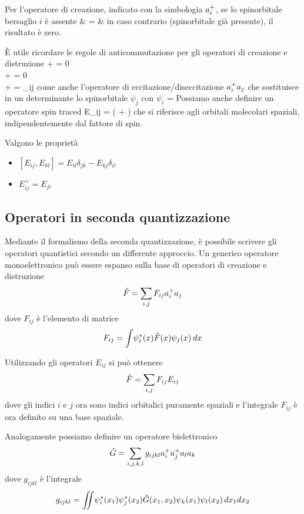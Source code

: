 Per l'operatore di creazione, indicato con la simbologia $a_{i}^{+}$, se
lo spinorbitale bersaglio $i$ \`e assente
\beqas
{} \detsl{\psi_1 \psi_2 \ldots } & = &
\eeqas
in caso contrario (spinorbitale gi\`a presente), il risultato \`e zero.

\`E utile ricordare le regole di anticommutazione per gli operatori di
creazione e distruzione
\beqas
{}+ = 0 \\
+ = 0 \\
+ = \delta_{ij}
\eeqas
come anche l'operatore di eccitazione/diseccitazione $a_{i}^{+}a_{j}$ che
sostituisce in un determinante lo spinorbitale $\psi_j$ con $\psi_i$
\beq
{}  =
\eeq
Possiamo anche definire un operatore spin traced
\beq
E_{ij} = \left(  +
 \right)
\eeq
che si riferisce agli orbitali molecolari spaziali,
indipendentemente dal fattore di spin.

Valgono le propriet\`a
\begin{itemize}
\item $ \left[ E_{ij}, E_{kl} \right] = E_{il}\delta_{jk} -
E_{kj}\delta_{il} $
\item $ E^{+}_{ij} = E_{ji} $
\end{itemize}

\subsection{Operatori in seconda quantizzazione}

Mediante il formalismo della seconda quantizzazione, \`e possibile
scrivere gli operatori quantistici secondo un differente approccio.
Un generico operatore monoelettronico pu\`o essere espanso sulla base di
operatori di creazione e distruzione
$$
\hat{F} = \sum_{i,j} F_{ij} a_{i}^{+}a_{j}
$$
dove $F_{ij}$ \`e l'elemento di matrice
$$
F_{ij} = \int \! \psi_i^{*}(x)\hat{F}(x)\psi_j(x) \: dx
$$

Utilizzando gli operatori $E_{ij}$ si pu\`o ottenere
$$
\hat{F} = \sum_{i,j} F_{ij}E_{ij}
$$
dove gli indici $i$ e $j$ ora sono indici orbitalici puramente spaziali
e l'integrale $F_{ij}$ \`e ora definito su una base spaziale.

Analogamente possiamo definire un operatore bielettronico
$$
\hat{G} = \sum_{i,j,k,l} g_{ijkl} a_{i}^{+}a_{j}^{+}a_{l}a_{k}
$$
dove $g_{ijkl}$ \`e l'integrale
$$
g_{ijkl} = \int \! \! \! \! \int \! \psi_i^*(x_1) \psi_j^*(x_2) \hat{G}(x_1,x_2) \psi_k(x_1)
\psi_l(x_2) \, dx_1 dx_2
$$

